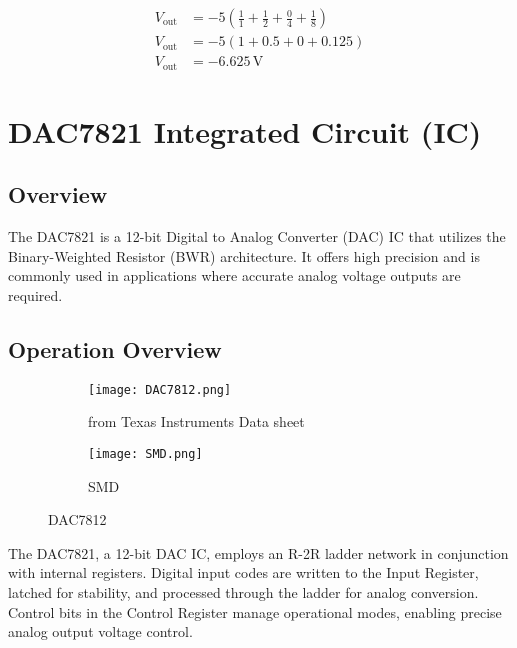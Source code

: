\documentclass{article}
\begin{document}
{\fontsize{10}{6}\selectfont
\begin{align}
    V_{\text{out}} &= -5 \left( \frac{1}{1} + \frac{1}{2} + \frac{0}{4} + \frac{1}{8} \right) \\
    V_{\text{out}} &= -5 \left( 1 + 0.5 + 0 + 0.125 \right) \\
    V_{\text{out}} &= -6.625 \, \text{V}
\end{align}
}

\section{DAC7821 Integrated Circuit (IC)}
\fontsize{14}{16}\selectfont

\subsection{Overview}

The DAC7821 is a 12-bit Digital to Analog Converter (DAC) IC that utilizes the Binary-Weighted Resistor (BWR) architecture. It offers high precision and is commonly used in applications where accurate analog voltage outputs are required.

\subsection{Operation Overview}

\begin{figure}[h]
    \centering
    \begin{subfigure}{0.35\linewidth}
        \centering
        \texttt{[image: DAC7812.png]}
        \caption{from Texas Instruments Data sheet }
        \label{fig:dac7812}
    \end{subfigure}\hspace{0.04\linewidth}
    \begin{subfigure}{0.35\linewidth}
        \centering
        \texttt{[image: SMD.png]}
        \caption{SMD}
        \label{fig:smd}
    \end{subfigure}
    \caption{DAC7812}
    \label{fig:combined}
\end{figure}

The DAC7821, a 12-bit DAC IC, employs an R-2R ladder network in conjunction with internal registers. Digital input codes are written to the Input Register, latched for stability, and processed through the ladder for analog conversion. Control bits in the Control Register manage operational modes, enabling precise analog output voltage control.
\end{document}

